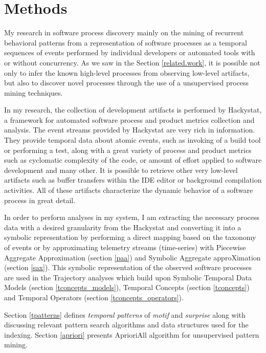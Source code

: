 \chapter{Methods} \label{methods}
My research in software process discovery mainly on the mining of recurrent behavioral patterns from a representation of software processes as a temporal sequences of events performed by individual developers or automated tools with or without concurrency. As we saw in the Section \ref{related.work}, it is possible not only to infer the known high-level processes from observing low-level artifacts, but also to discover novel processes through the use of a unsupervised process mining techniques.

In my research, the collection of development artifacts is performed by Hackystat, a framework for automated software process and product metrics collection and analysis. The event streams provided by Hackystat are very rich in information. They provide temporal data about atomic events, such as invoking of a build tool or performing a test, along with a great variety of process and product metrics such as cyclomatic complexity of the code, or amount of effort applied to software development and many other. It is possible to retrieve other very low-level artifacts such as buffer transfers within the IDE editor or background compilation activities. All of these artifacts characterize the dynamic behavior of a software process in great detail.

In order to perform analyses in my system, I am extracting the necessary process data with a desired granularity from the Hackystat and converting it into a symbolic representation by performing a direct mapping based on the taxonomy of events or by approximating telemetry streams (time-series) with Piecewise Aggregate Approximation (section \ref{paa}) and Symbolic Aggregate approXimation (section \ref{sax}). This symbolic representation of the observed software processes are used in the Trajectory analyses which build upon Symbolic Temporal Data Models (section \ref{tconcepts_models}), Temporal Concepts (section \ref{tconcepts}) and Temporal Operators (section \ref{tconcepts_operators}). 

Section \ref{tpatterns} defines \textit{temporal patterns} of \textit{motif} and \textit{surprise} along with discussing relevant pattern search algorithms and data structures used for the indexing. Section \ref{apriori} presents AprioriAll algorithm for unsupervised pattern mining.